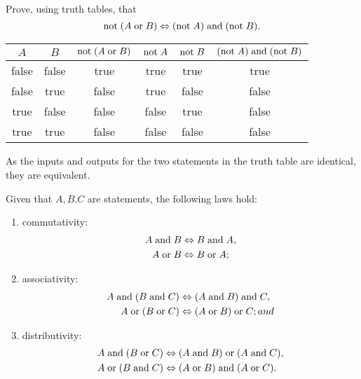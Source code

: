 \begin{example}
    Prove, using truth tables, that
    \[\text{not}\;(A\;\text{or}\; B)\Leftrightarrow(\text{not}\; A)\;\text{and}\; (\text{not}\; B).\]
    \begin{center}
        \centering
        \begin{tabular}{cccccc}
            \toprule
            $A$ & $B$ & $\text{not}\;(A\;\text{or}\; B)$ & $\text{not}\; A$ & $\text{not}\; B$ & $(\text{not}\; A)\;\text{and}\;(\text{not}\; B)$ \\
            \midrule
            false & false & true & true & true & true \\
            false & true & false & true & false & false \\
            true & false & false & false & true & false \\
            true & true & false & false & false & false \\
            \bottomrule
        \end{tabular}
    \end{center}
    As the inputs and outputs for the two statements in the truth table are identical, they are equivalent.
\end{example}

\begin{lemma}
    Given that $A,B.C$ are statements, the following laws hold:
    \begin{enumerate}
        \item commutativity:
        \begin{align*}
            A\;\text{and}\; B&\Leftrightarrow B\;\text{and}\; A,\\
            A\;\text{or}\; B&\Leftrightarrow B\;\text{or}\; A;
        \end{align*}
        
        \item associativity:
        \begin{align*}
            A\;\text{and}\;(B\;\text{and}\; C)&\Leftrightarrow(A\;\text{and}\; B)\;\text{and}\; C,\\
            A\;\text{or}\;(B\;\text{or}\; C)&\Leftrightarrow(A\;\text{or}\; B)\;\text{or}\; C; and
        \end{align*}
        
        \item distributivity:
        \begin{align*}
            A\;\text{and}\;(B\;\text{or}\; C)&\Leftrightarrow(A\;\text{and}\; B)\;\text{or}\;(A\;\text{and}\; C),\\
            A\;\text{or}\;(B\;\text{and}\; C)&\Leftrightarrow(A\;\text{or}\; B)\;\text{and}\;(A\;\text{or}\; C).
        \end{align*}
    \end{enumerate}
\end{lemma}

